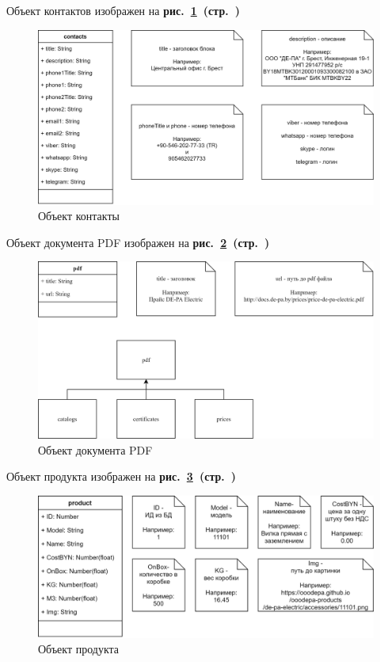 Объект контактов изображен на
\textbf{рис.~\ref{fig:gpi_a_contacts}~(стр.~\pageref{fig:gpi_a_contacts})}

\begin{figure}[!hp]
    \centering
    \includegraphics[width=16cm]
        {_assets/gpi_a_contacts.png}
    \caption{Объект контакты}
    \label{fig:gpi_a_contacts}
\end{figure}

Объект документа PDF изображен на
\textbf{рис.~\ref{fig:gpi_a_pdf}~(стр.~\pageref{fig:gpi_a_pdf})}

\begin{figure}[!hp]
    \centering
    \includegraphics[width=16cm]
        {_assets/gpi_a_pdf.png}
    \caption{Объект документа PDF}
    \label{fig:gpi_a_pdf}
\end{figure}

Объект продукта изображен на
\textbf{рис.~\ref{fig:gpi_a_product}~(стр.~\pageref{fig:gpi_a_product})}

\begin{figure}[!hp]
    \centering
    \includegraphics[width=16cm]
        {_assets/gpi_a_product.png}
    \caption{Объект продукта}
    \label{fig:gpi_a_product}
\end{figure}

